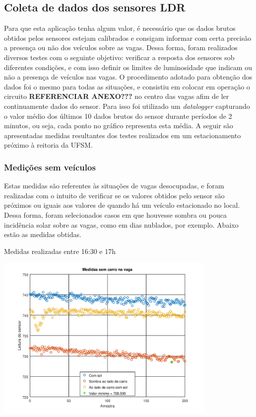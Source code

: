 \documentclass[oneside,openright,12pt]{ufsm_2015} %
\begin{document}
    \subsection{Coleta de dados dos sensores LDR}
    Para que esta aplicação tenha algum valor, é necessário que os dados brutos obtidos pelos sensores estejam calibrados e consigam informar com certa precisão a presença ou não dos veículos sobre as vagas. Dessa forma, foram realizados diversos testes com o seguinte objetivo: verificar a resposta dos sensores sob diferentes condições, e com isso definir os limites de luminosidade que indicam ou não a presença de veículos nas vagas. O procedimento adotado para obtenção dos dados foi o mesmo para todas as situações, e consistiu em colocar em operação o circuito \textbf{REFERENCIAR ANEXO???} no centro das vagas afim de ler continuamente dados do sensor. Para isso foi utilizado um \textit{datalogger} capturando o valor médio dos últimos 10 dados brutos do sensor durante períodos de 2 minutos, ou seja, cada ponto no gráfico representa esta média. A seguir são apresentadas medidas resultantes dos testes realizados em um estacionamento próximo à reitoria da UFSM.
    
    \subsubsection{Medições sem veículos}
    Estas medidas são referentes às situações de vagas desocupadas, e foram realizadas com o intuito de verificar se os valores obtidos pelo sensor são próximos ou iguais aos valores de quando há um veículo estacionado no local. Dessa forma, foram selecionados casos em que houvesse sombra ou pouca incidência solar sobre as vagas, como em dias nublados, por exemplo. Abaixo estão as medidas obtidas.
    
        \begin{grafico}[ht]
         	    \caption{\label{exepretex1}Medidas realizadas entre 16:30 e 17h}
    	    \centering
    	    \includegraphics[width=0.8\textwidth]{figuras/sem_carro_tarde.png}
    	    \vspace{\baselineskip} %
                \label{graph:medidas-tarde}
        \end{grafico}
    
\end{document}
